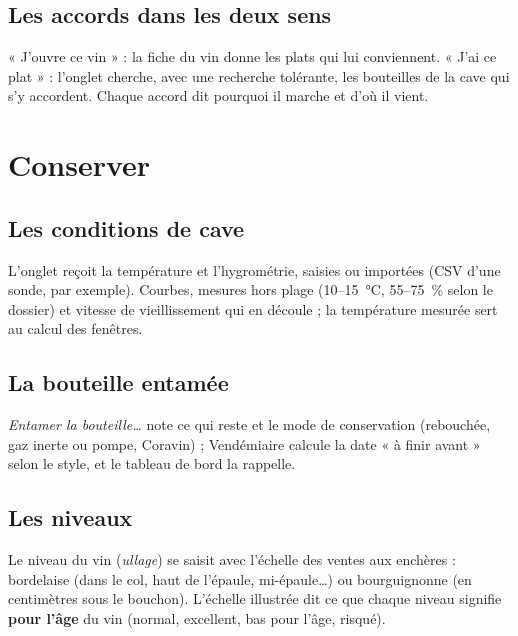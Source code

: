 \documentclass[11pt,a4paper]{article}
\begin{document}

\subsection{Les accords dans les deux sens}
« J'ouvre ce vin » : la fiche du vin donne les plats qui lui conviennent. « J'ai ce plat » : l'onglet
 cherche, avec une recherche tolérante, les bouteilles de la cave qui s'y accordent. Chaque
accord dit pourquoi il marche et d'où il vient.

\section{Conserver}
\subsection{Les conditions de cave}
L'onglet  reçoit la température et l'hygrométrie, saisies ou importées (CSV d'une
sonde, par exemple). Courbes, mesures hors plage (10–15~°C, 55–75~\% selon le dossier) et vitesse de
vieillissement qui en découle ; la température mesurée sert au calcul des fenêtres.


\subsection{La bouteille entamée}
\emph{Entamer la bouteille…} note ce qui reste et le mode de conservation (rebouchée, gaz inerte ou pompe,
Coravin) ; Vendémiaire calcule la date « à finir avant » selon le style, et le tableau de bord la rappelle.


\subsection{Les niveaux}
Le niveau du vin (\emph{ullage}) se saisit avec l'échelle des ventes aux enchères : bordelaise (dans le col,
haut de l'épaule, mi-épaule…) ou bourguignonne (en centimètres sous le bouchon). L'échelle illustrée dit
ce que chaque niveau signifie \textbf{pour l'âge} du vin (normal, excellent, bas pour l'âge, risqué).
\end{document}
